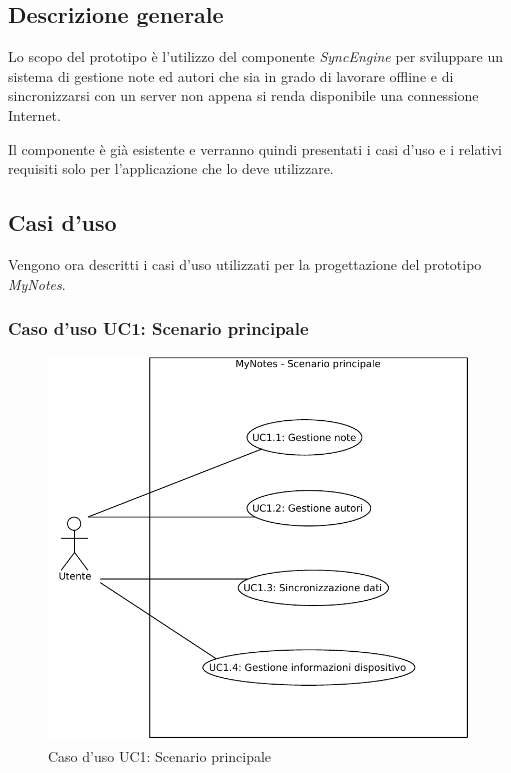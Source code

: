 \subsection{Descrizione generale}
Lo scopo del prototipo è  l'utilizzo del componente \emph{SyncEngine} per sviluppare un sistema di gestione note ed autori che sia in grado di lavorare offline e di sincronizzarsi con un server non appena si renda disponibile una connessione Internet.

Il componente è già esistente e verranno quindi presentati i casi d'uso e i relativi requisiti solo per l'applicazione che lo deve utilizzare.

\subsection{Casi d'uso}
Vengono ora descritti i casi d'uso utilizzati per la progettazione del prototipo \emph{MyNotes}.

\subsubsection{Caso d'uso UC1: Scenario principale}
\begin{figure}[htb]
\centering
\includegraphics[scale=0.6]{gfx/useCase/MN_UC1_Scenario_principale.pdf}
\caption{Caso d'uso UC1: Scenario principale}
\label{fig:My notes UC1}
\end{figure}

